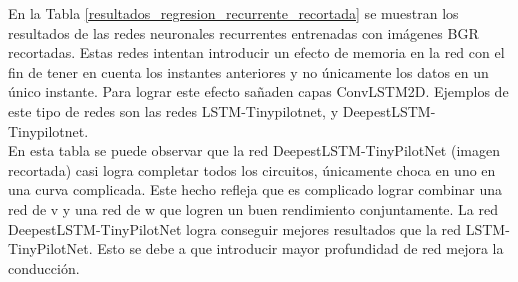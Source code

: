 En la Tabla \ref{resultados_regresion_recurrente_recortada} se muestran los resultados de las redes neuronales recurrentes entrenadas con imágenes BGR recortadas. Estas redes intentan introducir un efecto de memoria en la red con el fin de tener en cuenta los instantes anteriores y no únicamente los datos en un único instante. Para lograr este efecto sañaden capas ConvLSTM2D. Ejemplos de este tipo de redes son las redes LSTM-Tinypilotnet, y DeepestLSTM-Tinypilotnet.\\

En esta tabla se puede observar que la red DeepestLSTM-TinyPilotNet (imagen recortada) casi logra completar todos los circuitos, únicamente choca en uno en una curva complicada. Este hecho refleja que es complicado lograr combinar una red de v y una red de w que logren un buen rendimiento conjuntamente. La red DeepestLSTM-TinyPilotNet logra conseguir mejores resultados que la red LSTM-TinyPilotNet. Esto se debe a que introducir mayor profundidad de red mejora la conducción. \\



